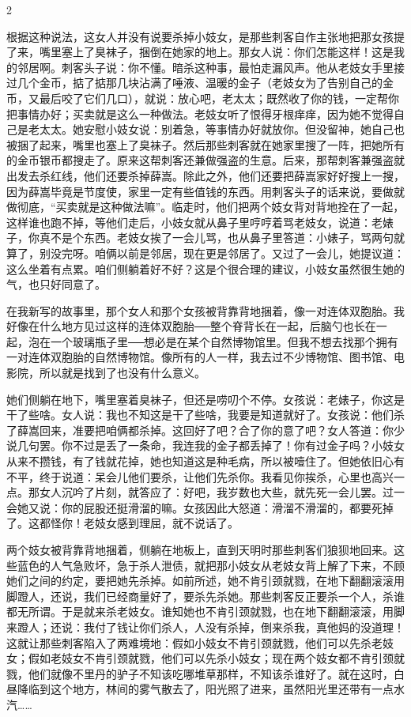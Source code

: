2 

根据这种说法，这女人并没有说要杀掉小妓女，是那些刺客自作主张地把那女孩提了来，嘴里塞上了臭袜子，捆倒在她家的地上。那女人说：你们怎能这样！这是我的邻居啊。刺客头子说：你不懂。暗杀这种事，最怕走漏风声。他从老妓女手里接过几个金币，掂了掂那几块沾满了唾液、温暖的金子（老妓女为了告别自己的金币，又最后咬了它们几口），就说：放心吧，老太太；既然收了你的钱，一定帮你把事情办好；买卖就是这么一种做法。老妓女听了恨得牙根痒痒，因为她不觉得自己是老太太。她安慰小妓女说：别着急，等事情办好就放你。但没留神，她自己也被捆了起来，嘴里也塞上了臭袜子。然后那些刺客就在她家里搜了一阵，把她所有的金币银币都搜走了。原来这帮刺客还兼做强盗的生意。后来，那帮刺客兼强盗就出发去杀红线，他们还要杀掉薛嵩。除此之外，他们还要把薛嵩家好好搜上一搜，因为薛嵩毕竟是节度使，家里一定有些值钱的东西。用刺客头子的话来说，要做就做彻底，“买卖就是这种做法嘛”。临走时，他们把两个妓女背对背地拴在了一起，这样谁也跑不掉，等他们走后，小妓女就从鼻子里哼哼着骂老妓女，说道：老婊子，你真不是个东西。老妓女挨了一会儿骂，也从鼻子里答道：小婊子，骂两句就算了，别没完呀。咱俩以前是邻居，现在更是邻居了。又过了一会儿，她提议道：这么坐着有点累。咱们侧躺着好不好？这是个很合理的建议，小妓女虽然很生她的气，也只好同意了。 

在我新写的故事里，那个女人和那个女孩被背靠背地捆着，像一对连体双胞胎。我好像在什么地方见过这样的连体双胞胎──整个脊背长在一起，后脑勺也长在一起，泡在一个玻璃瓶子里──想必是在某个自然博物馆里。但我不想去找那个拥有一对连体双胞胎的自然博物馆。像所有的人一样，我去过不少博物馆、图书馆、电影院，所以就是找到了也没有什么意义。 

她们侧躺在地下，嘴里塞着臭袜子，但还是唠叨个不停。女孩说：老婊子，你这是干了些啥。女人说：我也不知这是干了些啥，我要是知道就好了。女孩说：他们杀了薛嵩回来，准要把咱俩都杀掉。这回好了吧？合了你的意了吧？女人答道：你少说几句罢。你不过是丢了一条命，我连我的金子都丢掉了！你有过金子吗？小妓女从来不攒钱，有了钱就花掉，她也知道这是种毛病，所以被噎住了。但她依旧心有不平，终于说道：呆会儿他们要杀，让他们先杀你。我看见你挨杀，心里也高兴一点。那女人沉吟了片刻，就答应了：好吧，我岁数也大些，就先死一会儿罢。过一会她又说：你的屁股还挺滑溜的嘛。女孩因此大怒道：滑溜不滑溜的，都要死掉了。这都怪你！老妓女感到理屈，就不说话了。 

两个妓女被背靠背地捆着，侧躺在地板上，直到天明时那些刺客们狼狈地回来。这些蓝色的人气急败坏，急于杀人泄债，就把那小妓女从老妓女背上解了下来，不顾她们之间的约定，要把她先杀掉。如前所述，她不肯引颈就戮，在地下翻翻滚滚用脚蹬人，还说，我们已经商量好了，要杀先杀她。那些刺客反正要杀一个人，杀谁都无所谓。于是就来杀老妓女。谁知她也不肯引颈就戮，也在地下翻翻滚滚，用脚来蹬人；还说：我付了钱让你们杀人，人没有杀掉，倒来杀我，真他妈的没道理！这就让那些刺客陷入了两难境地：假如小妓女不肯引颈就戮，他们可以先杀老妓女；假如老妓女不肯引颈就戮，他们可以先杀小妓女；现在两个妓女都不肯引颈就戮，他们就像不里丹的驴子不知该吃哪堆草那样，不知该杀谁好了。就在这时，白昼降临到这个地方，林间的雾气散去了，阳光照了进来，虽然阳光里还带有一点水汽…… 

